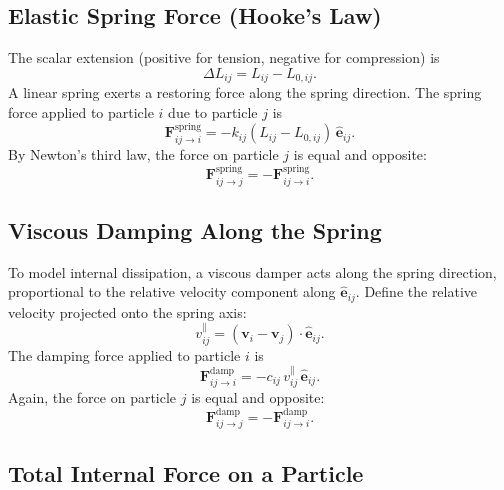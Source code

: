 \documentclass[manuscript,nonacm,12pt,letterpaper]{acmart}
\begin{document}
\subsection{Elastic Spring Force (Hooke's Law)}
\label{Sec4.2:SpringForce}

The scalar extension (positive for tension, negative for compression) is
\begin{equation}
\Delta L_{ij} = L_{ij} - L_{0,ij}.
\end{equation}
A linear spring exerts a restoring force along the spring direction. The spring force applied to particle $i$ due to particle $j$ is
\begin{equation}
\mathbf{F}^{\text{spring}}_{ij \rightarrow i}
= -k_{ij} (L_{ij} - L_{0,ij}) \, \hat{\mathbf{e}}_{ij}.
\label{eq:newton_spring_force}
\end{equation}
By Newton's third law, the force on particle $j$ is equal and opposite:
\begin{equation}
\mathbf{F}^{\text{spring}}_{ij \rightarrow j}
= -\mathbf{F}^{\text{spring}}_{ij \rightarrow i}.
\end{equation}

\subsection{Viscous Damping Along the Spring}
\label{Sec4.3:Damping}

To model internal dissipation, a viscous damper acts along the spring direction, proportional to the relative velocity component along $\hat{\mathbf{e}}_{ij}$. Define the relative velocity projected onto the spring axis:
\begin{equation}
v^{\parallel}_{ij} = (\mathbf{v}_i - \mathbf{v}_j)\cdot \hat{\mathbf{e}}_{ij}.
\end{equation}
The damping force applied to particle $i$ is
\begin{equation}
\mathbf{F}^{\text{damp}}_{ij \rightarrow i}
= -c_{ij} \, v^{\parallel}_{ij}\, \hat{\mathbf{e}}_{ij}.
\label{eq:newton_damping_force}
\end{equation}
Again, the force on particle $j$ is equal and opposite:
\begin{equation}
\mathbf{F}^{\text{damp}}_{ij \rightarrow j}
= -\mathbf{F}^{\text{damp}}_{ij \rightarrow i}.
\end{equation}

\subsection{Total Internal Force on a Particle}
\label{Sec4.4:TotalForce}
\end{document}
